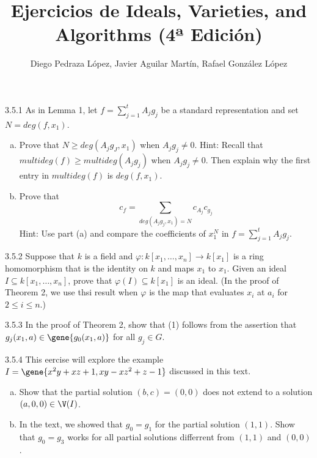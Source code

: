 \documentclass[twoside]{article}
\begin{document}
\title{Ejercicios de Ideals, Varieties, and Algorithms (4ª Edición)}
\author{Diego Pedraza López, Javier Aguilar Martín, Rafael González López}
\maketitle

\begin{ejercicio}{3.5.1}
As in Lemma 1, let $f = \sum_{j=1}^t A_j g_j$ be a standard representation and set $N = deg(f,x_1)$.
\begin{enumerate}[a.]
\item Prove that $N \geq deg(A_j g_J, x_1)$ when $A_j g_j \neq 0$.
Hint: Recall that $multideg(f) \geq multideg(A_j g_j)$ when $A_j g_j \neq 0$.
Then explain why the first entry in $multideg(f)$ is $deg(f,x_1)$.
\item Prove that
\[ c_f = \sum_{deg(A_j g_j, x_1) = N} c_{A_j}c_{g_j} \]
Hint: Use part (a) and compare the coefficients of $x_1^N$ in $f = \sum_{j=1}^t A_j g_j$.
\end{enumerate}
\end{ejercicio}

\newpage

\begin{ejercicio}{3.5.2}
Suppose that $k$ is a field and $\varphi \colon k[x_1,\dots,x_n] \to k[x_1]$ is a ring homomorphism that is the identity on $k$ and maps $x_1$ to $x_1$.
Given an ideal $I \subseteq k[x_1,\dots,x_n]$, prove that $\varphi(I) \subseteq k[x_1]$ is an ideal.
(In the proof of Theorem 2, we use thsi result when $\varphi$ is the map that evaluates $x_i$ at $a_i$ for $2 \leq i \leq n$.)
\end{ejercicio}

\newpage

\begin{ejercicio}{3.5.3}
In the proof of Theorem 2, show that (1) follows from the assertion that $g_j(x_1,a) \in \gene{g_0(x_1,a)}$ for all $g_j \in G$.
\end{ejercicio}

\newpage

\begin{ejercicio}{3.5.4}
This eercise will explore the example $I = \gene{x^2y+xz+1, xy-xz^2+z-1}$ discussed in this text.
\begin{enumerate}[a.]
\item Show that the partial solution $(b,c) = (0,0)$ does not extend to a solution $(a,0,0) \in \V(I)$.
\item In the text, we showed that $g_0 = g_1$ for the partial solution $(1,1)$.
Show that $g_0 = g_3$ works for all partial solutions differrent from $(1,1)$ and $(0,0)$.
\end{enumerate}
\end{ejercicio}
\end{document}
